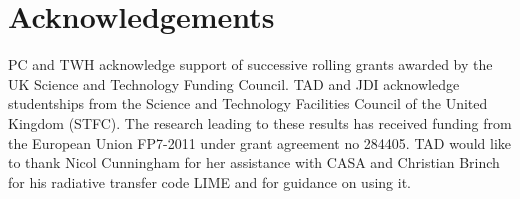 \documentclass[useAMS,usenatbib]{mn2e}
\begin{document}
\smallskip

\section*{Acknowledgements}
PC and TWH acknowledge support of successive rolling grants awarded by the UK Science and Technology Funding Council. 
TAD and JDI acknowledge studentships from the Science and Technology Facilities Council of the United Kingdom (STFC).
The research leading to these results has received funding from the European Union FP7-2011 under grant agreement no 284405.
TAD would like to thank Nicol Cunningham for her assistance with CASA and Christian Brinch for his radiative transfer code LIME and for guidance on using it.


 

\bsp
\label{lastpage}
\end{document}
